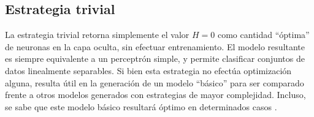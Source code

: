 %
\subsection{Estrategia trivial}
%
La estrategia trivial retorna simplemente el valor $H=0$ como cantidad
``óptima'' de neuronas en la capa oculta, sin efectuar entrenamiento.
El modelo resultante es siempre equivalente a un perceptrón simple, y
permite clasificar conjuntos de datos linealmente separables.
Si bien esta estrategia no efectúa optimización alguna, resulta útil
en la generación de un modelo ``básico'' para ser comparado frente a
otros modelos generados con estrategias de mayor complejidad.
Incluso, se sabe que este modelo básico resultará óptimo en
determinados casos \cite{nnfaq3}.
